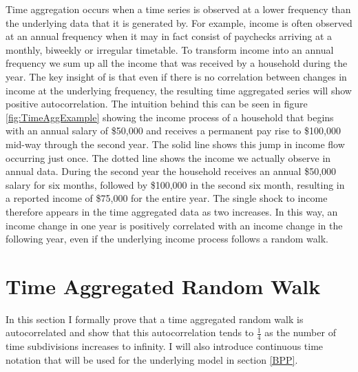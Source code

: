 \documentclass[AER]{AEA}
\begin{document}
Time aggregation occurs when a time series is observed at a lower frequency than the underlying data that it is generated by. For example, income is often observed at an annual frequency when it may in fact consist of paychecks arriving at a monthly, biweekly or irregular timetable. To transform income into an annual frequency we sum up all the income that was received by a household during the year. The key insight of \cite{working_note_1960} is that even if there is no correlation between changes in income at the underlying frequency, the resulting time aggregated series will show positive autocorrelation. The intuition behind this can be seen in figure \ref{fig:TimeAggExample} showing the income process of a household that begins with an annual salary of \$50,000 and receives a permanent pay rise to \$100,000 mid-way through the second year. The solid line shows this jump in income flow occurring just once. The dotted line shows the income we actually observe in annual data. During the second year the household receives an annual \$50,000 salary for six months, followed by \$100,000 in the second six month, resulting in a reported income of \$75,000 for the entire year. The single shock to income therefore appears in the time aggregated data as two increases. In this way, an income change in one year is positively correlated with an income change in the following year, even if the underlying income process follows a random walk.

\section{Time Aggregated Random Walk} \label{TimeAggRandomWalk}
In this section I formally prove that a time aggregated random walk is autocorrelated and show that this autocorrelation tends to $\frac{1}{4}$ as the number of time subdivisions increases to infinity. I will also introduce continuous time notation that will be used for the underlying model in section \ref{BPP}.
\end{document}
